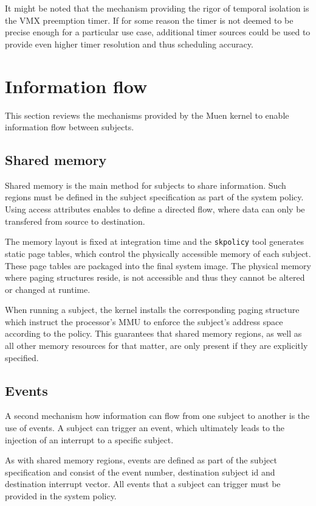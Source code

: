 It might be noted that the mechanism providing the rigor of temporal isolation
is the VMX preemption timer. If for some reason the timer is not deemed to be
precise enough for a particular use case, additional timer sources could be used
to provide even higher timer resolution and thus scheduling accuracy.

\section{Information flow}
This section reviews the mechanisms provided by the Muen kernel to enable
information flow between subjects.

\subsection{Shared memory}
Shared memory is the main method for subjects to share information. Such regions
must be defined in the subject specification as part of the system policy. Using
access attributes enables to define a directed flow, where data can only be
transfered from source to destination.

The memory layout is fixed at integration time and the \texttt{skpolicy} tool
generates static page tables, which control the physically accessible memory of
each subject. These page tables are packaged into the final system image. The
physical memory where paging structures reside, is not accessible and thus they
cannot be altered or changed at runtime.

When running a subject, the kernel installs the corresponding paging structure
which instruct the processor's MMU to enforce the subject's address space
according to the policy. This guarantees that shared memory regions, as well as
all other memory resources for that matter, are only present if they are
explicitly specified.

\subsection{Events}
A second mechanism how information can flow from one subject to another is the
use of events. A subject can trigger an event, which ultimately leads to the
injection of an interrupt to a specific subject.

As with shared memory regions, events are defined as part of the subject
specification and consist of the event number, destination subject id and
destination interrupt vector. All events that a subject can trigger must be
provided in the system policy.

